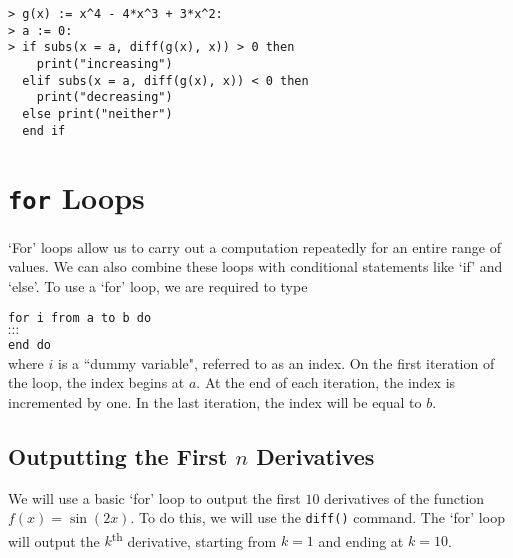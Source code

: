 \begin{maplegroup}
\begin{mapleinput}
\begin{verbatim}
> g(x) := x^4 - 4*x^3 + 3*x^2:
> a := 0:
> if subs(x = a, diff(g(x), x)) > 0 then
    print("increasing")
  elif subs(x = a, diff(g(x), x)) < 0 then
    print("decreasing")
  else print("neither")
  end if
\end{verbatim}
\end{mapleinput}
\mapleresult
\begin{maplelatex}
\end{maplelatex}
\end{maplegroup}


\section{\texttt{for} Loops}

`For' loops allow us to carry out a computation repeatedly for an entire range of values. We can also combine these loops with conditional statements like `if' and `else'. To use a `for' loop, we are required to type\\


\texttt{for i from a to b do}\\
\hspace{0.5cm}$\cdots$\\
\hspace{0.5cm}$\cdots$\\
\texttt{end do}\\

\noindent
where $i$ is a ``dummy variable", referred to as an index. On the first iteration of the loop, the index begins at $a$. At the end of each iteration, the index is incremented by one. In the last iteration, the index will be equal to $b$.

\subsection{Outputting the First $n$ Derivatives}

We will use a basic `for' loop to output the first $10$ derivatives of the function $f(x)=\sin(2x)$. To do this, we will use the \texttt{diff()} command. The `for' loop will output the $k$\textsuperscript{th} derivative, starting from $k=1$ and ending at $k=10$.

